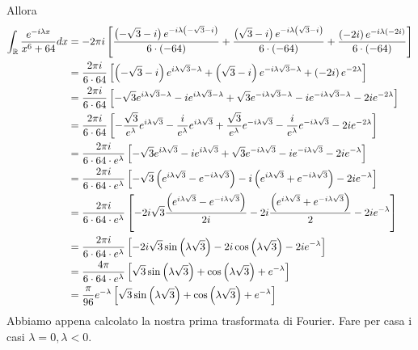 Allora
\begin{align*}
\int_{\mathbb{R}}\frac{e^{- i\lambda x}}{x^{6} + 64} dx & = - 2\pi i\left[\frac{\left(- \sqrt{3} - i\right) e^{- i\lambda \left(- \sqrt{3} - i\right)}}{6 \cdot \left(- 64\right)} + \frac{\left(\sqrt{3} - i\right) e^{- i\lambda \left(\sqrt{3} - i\right)}}{6 \cdot \left(- 64\right)} + \frac{\left(- 2i\right) e^{- i\lambda \left(- 2i\right)}}{6 \cdot \left(- 64\right)}\right]\\
 & = \frac{2\pi i}{6 \cdot 64}\left[\left(- \sqrt{3} - i\right) e^{i\lambda \sqrt{3} - \lambda} + \left(\sqrt{3} - i\right) e^{- i\lambda \sqrt{3} - \lambda} + \left(- 2i\right) e^{- 2\lambda}\right]\\
 & = \frac{2\pi i}{6 \cdot 64}\left[ - \sqrt{3} e^{i\lambda \sqrt{3} - \lambda} - ie^{i\lambda \sqrt{3} - \lambda} + \sqrt{3} e^{- i\lambda \sqrt{3} - \lambda} - ie^{- i\lambda \sqrt{3} - \lambda} - 2ie^{- 2\lambda}\right]\\
 & = \frac{2\pi i}{6 \cdot 64}\left[ - \frac{\sqrt{3}}{e^{\lambda}} e^{i\lambda \sqrt{3}} - \frac{i}{e^{\lambda}} e^{i\lambda \sqrt{3}} + \frac{\sqrt{3}}{e^{\lambda}} e^{- i\lambda \sqrt{3}} - \frac{i}{e^{\lambda}} e^{- i\lambda \sqrt{3}} - 2ie^{- 2\lambda}\right]\\
 & = \frac{2\pi i}{6 \cdot 64 \cdot e^{\lambda}}\left[ - \sqrt{3} e^{i\lambda \sqrt{3}} - ie^{i\lambda \sqrt{3}} + \sqrt{3} e^{- i\lambda \sqrt{3}} - ie^{- i\lambda \sqrt{3}} - 2ie^{- \lambda}\right]\\
 & = \frac{2\pi i}{6 \cdot 64 \cdot e^{\lambda}}\left[ - \sqrt{3}\left(e^{i\lambda \sqrt{3}} - e^{- i\lambda \sqrt{3}}\right) - i\left(e^{i\lambda \sqrt{3}} + e^{- i\lambda \sqrt{3}}\right) - 2ie^{- \lambda}\right]\\
 & = \frac{2\pi i}{6 \cdot 64 \cdot e^{\lambda}}\left[ - 2i\sqrt{3}\frac{\left(e^{i\lambda \sqrt{3}} - e^{- i\lambda \sqrt{3}}\right)}{2i} - 2i\frac{\left(e^{i\lambda \sqrt{3}} + e^{- i\lambda \sqrt{3}}\right)}{2} - 2ie^{- \lambda}\right]\\
 & = \frac{2\pi i}{6 \cdot 64 \cdot e^{\lambda}}\left[ - 2i\sqrt{3}\sin\left(\lambda \sqrt{3}\right) - 2i\cos\left(\lambda \sqrt{3}\right) - 2ie^{- \lambda}\right]\\
 & = \frac{4\pi}{6 \cdot 64 \cdot e^{\lambda}}\left[\sqrt{3}\sin\left(\lambda \sqrt{3}\right) + \cos\left(\lambda \sqrt{3}\right) + e^{- \lambda}\right]\\
 & = \frac{\pi}{96} e^{- \lambda}\left[\sqrt{3}\sin\left(\lambda \sqrt{3}\right) + \cos\left(\lambda \sqrt{3}\right) + e^{- \lambda}\right]
\end{align*}
Abbiamo appena calcolato la nostra prima trasformata di Fourier. Fare per casa i casi $\lambda = 0, \lambda < 0$.

